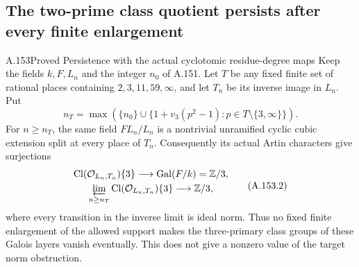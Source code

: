 \subsection{The two-prime class quotient persists after every finite enlargement}

\begin{statement}{A.153}{Proved}
{Persistence with the actual cyclotomic residue-degree maps}
Keep the fields \(k,F,L_n\) and the integer \(n_0\) of A.151.
Let \(T\) be any fixed finite set of rational places containing
\(2,3,11,59,\infty\), and let \(T_n\) be its inverse image in \(L_n\).
Put
\[
 n_T=\max\left(\{n_0\}\cup
       \{1+v_3(p^2-1):p\in T\setminus\{3,\infty\}\}\right).
\tag{A.153.1}
\]
For \(n\geq n_T\), the same field \(FL_n/L_n\) is a
nontrivial unramified cyclic cubic extension split at every place of
\(T_n\).  Consequently its actual Artin characters give surjections
\[
 \begin{gathered}
 \operatorname{Cl}(\mathcal O_{L_n,T_n})\{3\}
                       \longrightarrow\operatorname{Gal}(F/k)=\mathbb Z/3,\\
 \varprojlim_{n\geq n_T}
       \operatorname{Cl}(\mathcal O_{L_n,T_n})\{3\}
                       \longrightarrow\mathbb Z/3,
 \end{gathered}
\tag{A.153.2}
\]
where every transition in the inverse limit is ideal norm.
Thus no fixed finite enlargement of the allowed support makes the
three-primary class groups of these Galois layers vanish eventually.
This does not give a nonzero value of the target norm obstruction.
\end{statement}
